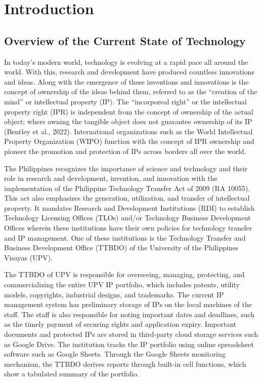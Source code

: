 \chapter{Introduction}

\section{Overview of the Current State of Technology}

In today’s modern world, technology is evolving at a rapid pace all around the world. With this, research and development have produced countless innovations and ideas. Along with the emergence of these inventions and innovations is the concept of ownership of the ideas behind them, referred to as the “creation of the mind” or intellectual property (IP). The “incorporeal right” or the intellectual property right (IPR) is independent from the concept of ownership of the actual object; where owning the tangible object does not guarantee ownership of its IP (Bentley et al., 2022). International organizations such as the World Intellectual Property Organization (WIPO) function with the concept of IPR ownership and pioneer the promotion and protection of IPs across borders all over the world.

The Philippines recognizes the importance of science and technology and their role in research and development, invention, and innovation with the implementation of the Philippine Technology Transfer Act of 2009 (RA 10055). This act also emphasizes the generation, utilization, and transfer of intellectual property. It mandates Research and Development Institutions (RDI) to establish Technology Licensing Offices (TLOs) and/or Technology Business Development Offices wherein these institutions have their own policies for technology transfer and IP management. One of these institutions is the Technology Transfer and Business Development Office (TTBDO) of the University of the Philippines Visayas (UPV).

The TTBDO of UPV is responsible for overseeing, managing, protecting, and commercializing the entire UPV IP portfolio, which includes patents, utility models, copyrights, industrial designs, and trademarks. The current IP management system has preliminary storage of IPs on the local machines of the staff. The staff is also responsible for noting important dates and deadlines, such as the timely payment of securing rights and application expiry. Important documents and protected IPs are stored in third-party cloud storage services such as Google Drive. The institution tracks the IP portfolio using online spreadsheet software such as Google Sheets. Through the Google Sheets monitoring mechanism, the TTBDO derives reports through built-in cell functions, which show a tabulated summary of the portfolio.

